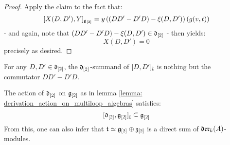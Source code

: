 \begin{proof}
                Apply the claim to the fact that:
                    $$[X(D, D'), Y]_{\mathfrak{g}_{[2]}} = y \left( ( DD' - D'D) - \xi(D, D') \right)( g(v, t) )$$
                - and again, note that $( DD' - D'D) - \xi(D, D') \in \mathfrak{d}_{[2]}$ - then yields:
                    $$X(D, D') = 0$$
                precisely as desired. 
            \end{proof}
        \begin{corollary}
            For any $D, D' \in \mathfrak{d}_{[2]}$, the $\mathfrak{d}_{[2]}$-summand of $[D, D']_{\hat{\mathfrak{t}}}$ is nothing but the commutator $DD' - D'D$.
        \end{corollary} 
        \begin{corollary} \label{coro: derivation_action_on_multiloop_algebras}
            The action of $\mathfrak{d}_{[2]}$ on $\mathfrak{g}_{[2]}$ as in lemma \ref{lemma: derivation_action_on_multiloop_algebras} satisfies:
                $$[\mathfrak{d}_{[2]}, \mathfrak{g}_{[2]}]_{\hat{\mathfrak{t}}} \subseteq \mathfrak{g}_{[2]}$$
            From this, one can also infer that $\mathfrak{t} \simeq \mathfrak{g}_{[2]} \oplus \mathfrak{z}_{[2]}$ is a direct sum of $\mathfrak{der}_k(A)$-modules. 
        \end{corollary}

